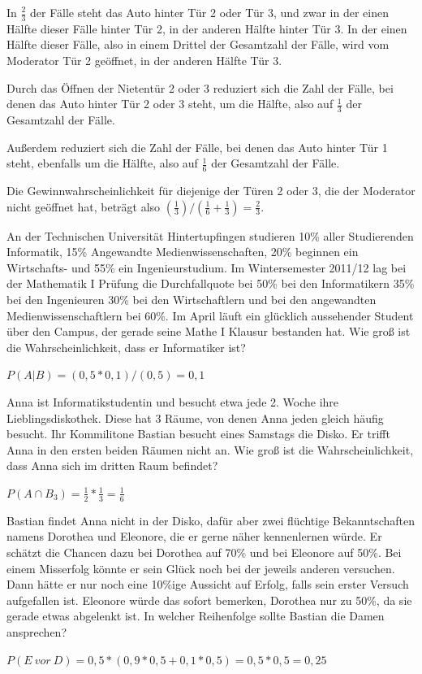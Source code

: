 \documentclass[10pt, a4paper]{exam}
\begin{document}
\begin{questions}
\begin{solution}
        In $\frac{2}{3}$ der Fälle steht das Auto hinter Tür 2 oder Tür 3, und zwar in der einen Hälfte dieser Fälle hinter Tür 2, in der anderen Hälfte hinter Tür 3. In der einen Hälfte dieser Fälle, also in einem Drittel der Gesamtzahl der Fälle, wird vom Moderator Tür 2 geöffnet, in der anderen Hälfte Tür 3.

        Durch das Öffnen der Nietentür 2 oder 3 reduziert sich die Zahl der Fälle, bei denen das Auto hinter Tür 2 oder 3 steht, um die Hälfte, also auf $\frac{1}{3}$ der Gesamtzahl der Fälle.

        Außerdem reduziert sich die Zahl der Fälle, bei denen das Auto hinter Tür 1 steht, ebenfalls um die Hälfte, also auf $\frac{1}{6}$ der Gesamtzahl der Fälle.

        Die Gewinnwahrscheinlichkeit für diejenige der Türen 2 oder 3, die der Moderator nicht geöffnet hat, beträgt also $(\frac{1}{3})/(\frac{1}{6}+\frac{1}{3}) = \frac{2}{3}$.
    \end{solution}

    \question An der Technischen Universität Hintertupfingen studieren 10\% aller Studierenden Informatik, 15\% Angewandte Medienwissenschaften, 20\% beginnen ein Wirtschafts- und 55\% ein Ingenieurstudium. Im Wintersemester 2011/12 lag bei der Mathematik I Prüfung die Durchfallquote bei 50\% bei den Informatikern 35\% bei den Ingenieuren 30\% bei den Wirtschaftlern und bei den angewandten Medienwissenschaftlern bei 60\%. Im April läuft ein glücklich aussehender Student über den Campus, der gerade seine Mathe I Klausur bestanden hat. Wie groß ist die Wahrscheinlichkeit, dass er Informatiker ist?
    \begin{solution}
        $P(A|B)=(0,5*0,1)/(0,5)=0,1$
    \end{solution}

    \question Anna ist Informatikstudentin und besucht etwa jede 2. Woche ihre Lieblingsdiskothek. Diese hat 3 Räume, von denen Anna jeden gleich häufig besucht. Ihr Kommilitone Bastian besucht eines Samstags die Disko. Er trifft Anna in den ersten beiden Räumen nicht an. Wie groß ist die Wahrscheinlichkeit, dass Anna sich im dritten Raum befindet?
    \begin{solution}
        $P(A\cap B_3)= \frac{1}{2}*\frac{1}{3} = \frac{1}{6}$
    \end{solution}

    \question Bastian findet Anna nicht in der Disko, dafür aber zwei flüchtige Bekanntschaften namens Dorothea und Eleonore, die er gerne näher kennenlernen würde. Er schätzt die Chancen dazu bei Dorothea auf 70\% und bei Eleonore auf 50\%. Bei einem Misserfolg könnte er sein Glück noch bei der jeweils anderen versuchen. Dann hätte er nur noch eine 10\%ige Aussicht auf Erfolg, falls sein erster Versuch aufgefallen ist. Eleonore würde das sofort bemerken, Dorothea nur zu 50\%, da sie gerade etwas abgelenkt ist. In welcher Reihenfolge sollte Bastian die Damen ansprechen?
    \begin{solution}
        $P(E\ vor\ D)= 0,5*(0,9*0,5+0,1*0,5)=0,5*0,5=0,25$


\end{solution}
\end{questions}
\end{document}
